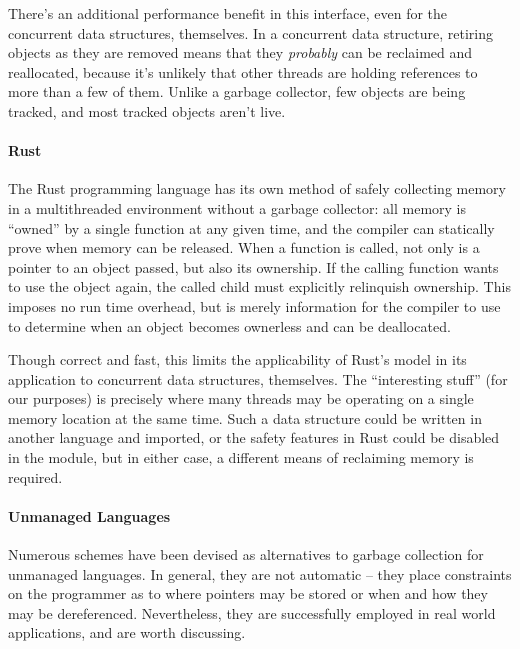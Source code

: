 There's an additional performance benefit in this interface, even for the concurrent data structures, themselves.  In a concurrent data structure, retiring objects as they are removed means that they \textit{probably} can be reclaimed and reallocated, because it's unlikely that other threads are holding references to more than a few of them.  Unlike a garbage collector, few objects are being tracked, and most tracked objects aren't live.

\paragraph{Rust} The Rust programming language has its own method of safely collecting memory in a multithreaded environment without a garbage collector: all memory is ``owned'' by a single function at any given time, and the compiler can statically prove when memory can be released.\cite{Rust}  When a function is called, not only is a pointer to an object passed, but also its ownership.  If the calling function wants to use the object again, the called child must explicitly relinquish ownership.  This imposes no run time overhead, but is merely information for the compiler to use to determine when an object becomes ownerless and can be deallocated.

Though correct and fast, this limits the applicability of Rust's model in its application to concurrent data structures, themselves.  The ``interesting stuff'' (for our purposes) is precisely where many threads may be operating on a single memory location at the same time.  Such a data structure could be written in another language and imported, or the safety features in Rust could be disabled in the module, but in either case, a different means of reclaiming memory is required.


\paragraph{Unmanaged Languages} Numerous schemes have been devised as alternatives to garbage collection for unmanaged languages.  In general, they are not automatic -- they place constraints on the programmer as to where pointers may be stored or when and how they may be dereferenced.  Nevertheless, they are successfully employed in real world applications, and are worth discussing.

